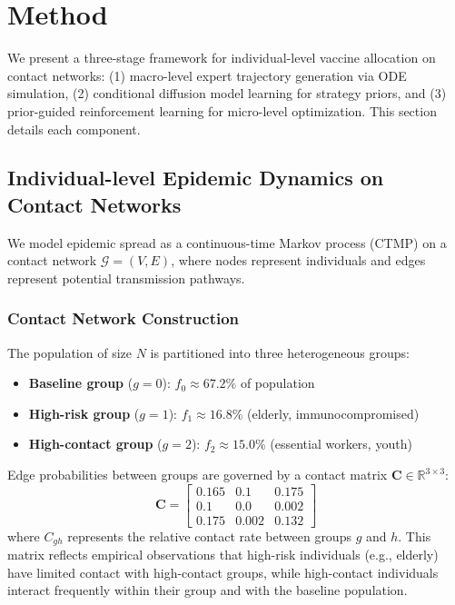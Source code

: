 \section{Method}

We present a three-stage framework for individual-level vaccine allocation on contact networks:
(1) macro-level expert trajectory generation via ODE simulation,
(2) conditional diffusion model learning for strategy priors,
and (3) prior-guided reinforcement learning for micro-level optimization.
This section details each component.

\subsection{Individual-level Epidemic Dynamics on Contact Networks}
\label{sec:ctmp}

We model epidemic spread as a continuous-time Markov process (CTMP) on a contact network
$\mathcal{G} = (V, E)$, where nodes represent individuals and edges represent potential
transmission pathways.

\subsubsection{Contact Network Construction}

The population of size $N$ is partitioned into three heterogeneous groups:
\begin{itemize}
    \item \textbf{Baseline group} ($g=0$): $f_0 \approx 67.2\%$ of population
    \item \textbf{High-risk group} ($g=1$): $f_1 \approx 16.8\%$ (elderly, immunocompromised)
    \item \textbf{High-contact group} ($g=2$): $f_2 \approx 15.0\%$ (essential workers, youth)
\end{itemize}

Edge probabilities between groups are governed by a contact matrix $\mathbf{C} \in \mathbb{R}^{3 \times 3}$:
\begin{equation}
\mathbf{C} = \begin{bmatrix}
0.165 & 0.1 & 0.175 \\
0.1 & 0.0 & 0.002 \\
0.175 & 0.002 & 0.132
\end{bmatrix}
\end{equation}
where $C_{gh}$ represents the relative contact rate between groups $g$ and $h$.
This matrix reflects empirical observations that high-risk individuals (e.g., elderly)
have limited contact with high-contact groups, while high-contact individuals interact
frequently within their group and with the baseline population.

